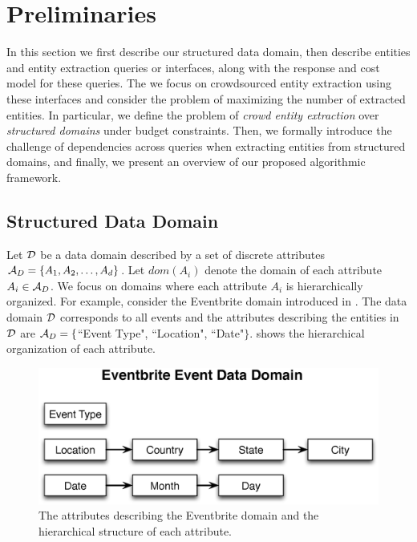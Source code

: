 
\section{Preliminaries}
\label{sec:prelims}
In this section we first describe our structured data domain, then describe entities and entity extraction queries or interfaces, along with the response and cost model for these queries. The we focus on crowdsourced entity extraction using these interfaces and consider the problem of maximizing the number of extracted entities. In particular, we define the problem of {\em crowd entity extraction} over {\em structured domains} under budget constraints. Then, we formally introduce the challenge of dependencies across queries when extracting entities from structured domains, and finally, we present an overview of our proposed algorithmic framework. 


\subsection{Structured Data Domain}
\label{sec:data-domain}

Let $\mathcal{D}$ be a data domain described by a set of discrete attributes $\mathcal{A}_D = \{A_1, A_2, \dots, A_d\}$. Let $dom(A_i)$ denote the domain of each attribute $A_i  \in \mathcal{A}_D$. We focus on domains where each attribute $A_i$ is hierarchically organized. For example, consider the Eventbrite domain introduced in . The data domain $\mathcal{D}$ corresponds to all events and the attributes describing the entities in $\mathcal{D}$ are $\mathcal{A}_D = \{$``Event Type", ``Location", ``Date"$\}$.  shows the hierarchical organization of each attribute.

\begin{figure}[h]
	\begin{center}
	\includegraphics[clip,scale=0.4]{figs/eventsDomain.eps}
	\caption{The attributes describing the Eventbrite domain and the hierarchical structure of each attribute.}
	\label{fig:eventsdomain}
	\end{center}
	\vspace{-10pt}
\end{figure}


